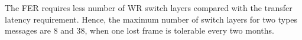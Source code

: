 The FER requires less number of WR switch layers compared with the transfer latency requirement. Hence, the maximum number of switch layers for two types messages are 8 and 38, when one lost frame is tolerable every two months. 

